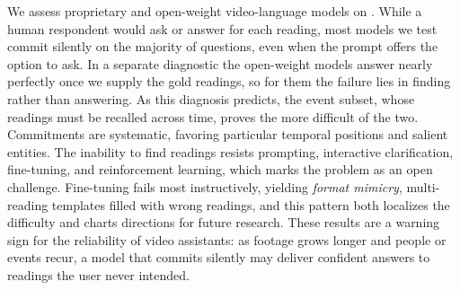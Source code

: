 We assess proprietary and open-weight video-language models on \bench{}. While a human respondent would ask or answer for each reading, most models we test commit silently on the majority of questions, even when the prompt offers the option to ask. In a separate diagnostic the open-weight models answer nearly perfectly once we supply the gold readings, so for them the failure lies in finding rather than answering. As this diagnosis predicts, the event subset, whose readings must be recalled across time, proves the more difficult of the two. Commitments are systematic, favoring particular temporal positions and salient entities. The inability to find readings resists prompting, interactive clarification, fine-tuning, and reinforcement learning, which marks the problem as an open challenge. Fine-tuning fails most instructively, yielding \textit{format mimicry}, multi-reading templates filled with wrong readings, and this pattern both localizes the difficulty and charts directions for future research. These results are a warning sign for the reliability of video assistants: as footage grows longer and people or events recur, a model that commits silently may deliver confident answers to readings the user never intended.
